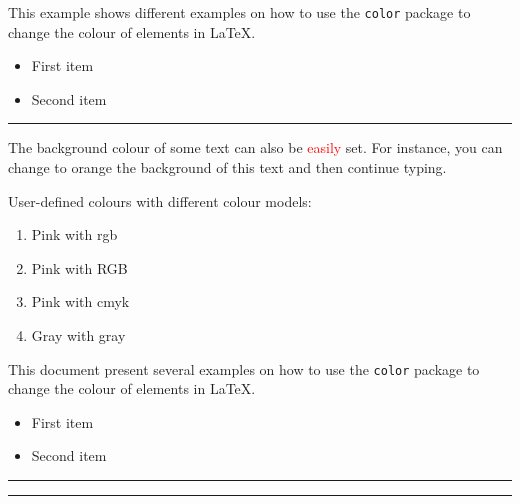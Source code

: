 \documentclass{scrbook}
\begin{document}
This example shows different examples on how to use the \texttt{color} package
to change the colour of elements in \LaTeX.

\begin{itemize}
\color{ForestGreen}
\item First item
\item Second item
\end{itemize}

\noindent
{\color{RubineRed} \rule{\linewidth}{0.5mm} }

The background colour of some text can also be \textcolor{red}{easily} set. For
instance, you can change to orange the background of \colorbox{BurntOrange}{this
text} and then continue typing.


User-defined colours with different colour models:

\begin{enumerate}
\item \textcolor{mypink1}{Pink with rgb}
\item \textcolor{mypink2}{Pink with RGB}
\item \textcolor{mypink3}{Pink with cmyk}
\item \textcolor{mygray}{Gray with gray}
\end{enumerate}

This document present several examples on how to use the \texttt{color} package
to change the colour of elements in \LaTeX.

\begin{itemize}
\item \textcolor{Mycolor1}{First item}
\item \textcolor{Mycolor2}{Second item}
\end{itemize}

\noindent
{\color{LightRubineRed} \rule{\linewidth}{1mm} }

\noindent
{\color{RubineRed} \rule{\linewidth}{1mm} }
\end{document}
